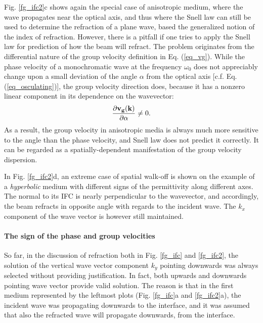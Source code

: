 Fig. \ref{fg_ifc2}c shows again the special case of anisotropic medium, where the wave propagates near the optical axis, and thus where the Snell law can still be used to determine the refraction of a plane wave, based the generalized notion of the index of refraction.
However, there is a pitfall if one tries to apply the Snell law for prediction of how the beam will refract. The problem originates from the differential nature of the group velocity definition in Eq. (\ref{eq_vg}). 
While the phase velocity of a monochromatic wave at the frequency $\omega_0$ does not appreciably change upon a small deviation of the angle $\alpha$ from the optical axis  [c.f.  Eq. (\ref{eq_osculating})], the group velocity direction does, because it has a nonzero linear component in its dependence on the wavevector:
$$ \frac{\partial {\mathbf{v_g}}({\mathbf{k}})}{\partial \alpha} \neq 0.$$
As a result, the group velocity in anisotropic media is always much more sensitive to the angle than the phase velocity, and Snell law does not predict it correctly. It can be regarded as a spatially-dependent manifestation of the group velocity dispersion.

In Fig. \ref{fg_ifc2}d, an extreme case of spatial walk-off is shown on the example of a \textit{hyperbolic} medium with different signs of the permittivity along different axes. %
 The normal to its IFC is nearly perpendicular to the wavevector, and accordingly, the beam refracts in opposite angle with regards to the incident wave. The $k_x$ component of the wave vector is however still maintained.


\paragraph{The sign of the phase and group velocities}  %
So far, in the discussion of refraction both in Fig. \ref{fg_ifc} and \ref{fg_ifc2}, the solution of the vertical wave vector component $k_y$ pointing downwards was always selected without providing justification. In fact, both upwards and downwards pointing wave vector provide valid solution. The reason is that in the first medium represented by the leftmost plots (Fig. \ref{fg_ifc}a and \ref{fg_ifc2}a), the incident wave was propagating downwards to the interface, and it was assumed that also the refracted wave will propagate downwards, from the interface.

